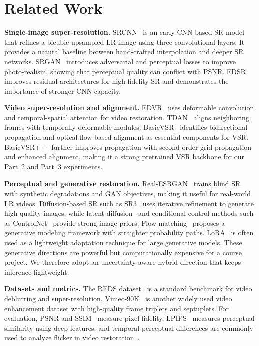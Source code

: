 \section{Related Work}
\textbf{Single-image super-resolution.}
SRCNN~\cite{dong2015srcnn} is an early CNN-based SR model that refines a bicubic-upsampled LR image using three convolutional layers. It provides a natural baseline between hand-crafted interpolation and deeper SR networks. SRGAN~\cite{ledig2017srgan} introduces adversarial and perceptual losses to improve photo-realism, showing that perceptual quality can conflict with PSNR. EDSR~\cite{lim2017edsr} improves residual architectures for high-fidelity SR and demonstrates the importance of stronger CNN capacity.

\textbf{Video super-resolution and alignment.}
EDVR~\cite{wang2019edvr} uses deformable convolution and temporal-spatial attention for video restoration. TDAN~\cite{tian2020tdan} aligns neighboring frames with temporally deformable modules. BasicVSR~\cite{chan2021basicvsr} identifies bidirectional propagation and optical-flow-based alignment as essential components for VSR. BasicVSR++~\cite{chan2022basicvsrpp} further improves propagation with second-order grid propagation and enhanced alignment, making it a strong pretrained VSR backbone for our Part~2 and Part~3 experiments.

\textbf{Perceptual and generative restoration.}
Real-ESRGAN~\cite{wang2021realesrgan} trains blind SR with synthetic degradations and GAN objectives, making it useful for real-world LR videos. Diffusion-based SR such as SR3~\cite{saharia2022sr3} uses iterative refinement to generate high-quality images, while latent diffusion~\cite{rombach2022ldm} and conditional control methods such as ControlNet~\cite{zhang2023controlnet} provide strong image priors. Flow matching~\cite{lipman2023flowmatching} proposes a generative modeling framework with straighter probability paths. LoRA~\cite{hu2022lora} is often used as a lightweight adaptation technique for large generative models. These generative directions are powerful but computationally expensive for a course project. We therefore adopt an uncertainty-aware hybrid direction that keeps inference lightweight.

\textbf{Datasets and metrics.}
The REDS dataset~\cite{nah2019reds} is a standard benchmark for video deblurring and super-resolution. Vimeo-90K~\cite{xue2019vimeo90k} is another widely used video enhancement dataset with high-quality frame triplets and septuplets. For evaluation, PSNR and SSIM~\cite{wang2004ssim} measure pixel fidelity, LPIPS~\cite{zhang2018lpips} measures perceptual similarity using deep features, and temporal perceptual differences are commonly used to analyze flicker in video restoration~\cite{chu2020tlpips}.
